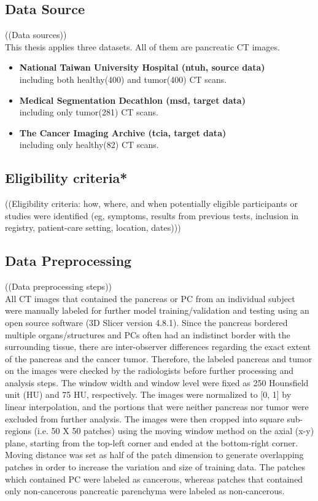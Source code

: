 \subsection{Data Source}
((Data sources)) \\
This thesis applies three datasets. All of them are pancreatic CT images.
\begin{itemize}
    \item {\bf National Taiwan University Hospital (ntuh, source data)} \\including both healthy(400) and tumor(400) CT scans. 
    \item {\bf Medical Segmentation Decathlon\cite{simpson2019large} (msd, target data)}\\ including only tumor(281) CT scans. 
    \item {\bf The Cancer Imaging Archive (tcia, target data)}\\ including only healthy(82) CT scans. 
\end{itemize}

\subsection{Eligibility criteria*}
((Eligibility criteria: how, where, and when potentially eligible participants or studies were identified (eg,
symptoms, results from previous tests, inclusion in registry, patient-care setting, location, dates))) \\

\subsection{Data Preprocessing}
((Data preprocessing steps)) \\
All CT images that contained the pancreas or PC from an individual subject were manually labeled for further model training/validation and testing using an open source software (3D Slicer version 4.8.1). 
Since the pancreas bordered multiple organs/structures and PCs often had an indistinct border with the surrounding tissue, there are inter-observer differences regarding the exact extent of the pancreas and the cancer tumor. Therefore, the labeled pancreas and tumor on the images were checked by the radiologists before further processing and analysis steps. The window width and window level were fixed as 250 Hounsfield unit (HU) and 75 HU, respectively. The images were normalized to [0, 1] by linear interpolation, and the portions that were neither pancreas nor tumor were excluded from further analysis. The images were then cropped into square sub-regions (i.e. 50 X 50 patches) using the moving window method on the axial (x-y) plane, starting from the top-left corner and ended at the bottom-right corner. Moving distance was set as half of the patch dimension to generate overlapping patches in order to increase the variation and size of training data. The patches which contained PC were labeled as cancerous, whereas patches that contained only non-cancerous pancreatic parenchyma were labeled as non-cancerous.

